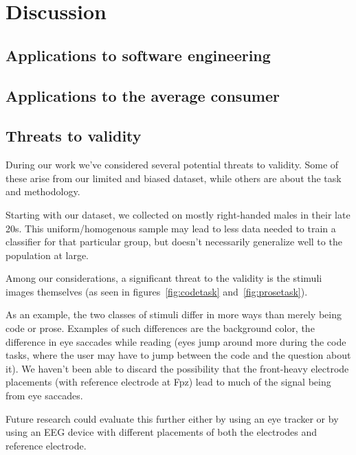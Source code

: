 \section{Discussion}


\subsection{Applications to software engineering}

\subsection{Applications to the average consumer}

\subsection{Threats to validity}

    During our work we've considered several potential threats to validity. Some of these arise from our limited and biased dataset, while others are about the task and methodology.

    Starting with our dataset, we collected on mostly right-handed males in their late 20s. This uniform/homogenous sample may lead to less data needed to train a classifier for that particular group, but doesn't necessarily generalize well to the population at large.

    Among our considerations, a significant threat to the validity is the stimuli images themselves (as seen in figures~\ref{fig:codetask} and~\ref{fig:prosetask}). 

    As an example, the two classes of stimuli differ in more ways than merely being code or prose. Examples of such differences are the background color, the difference in eye saccades while reading (eyes jump around more during the code tasks, where the user may have to jump between the code and the question about it). We haven't been able to discard the possibility that the front-heavy electrode placements (with reference electrode at Fpz) lead to much of the signal being from eye saccades. 

    Future research could evaluate this further either by using an eye tracker or by using an EEG device with different placements of both the electrodes and reference electrode.


